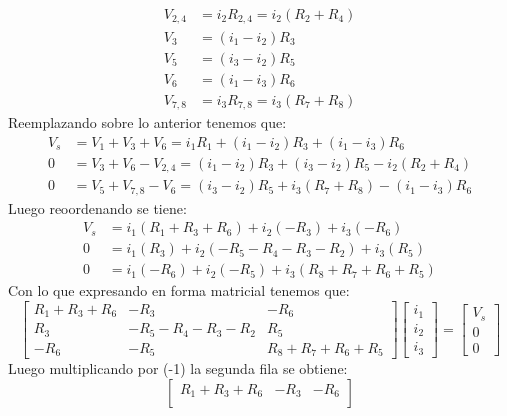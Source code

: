 \documentclass[
  11pt,
  letterpaper,
   addpoints,
   answers
  ]{exam}
\begin{document}
\begin{solution}
\begin{enumerate}
\begin{align}
        V_{2,4} &= i_2 R_{2,4}= i_2 (R_2 + R_4) \\
        V_3 &= (i_1 - i_2) R_3 \\
        V_5 &= (i_3 - i_2) R_5 \\
        V_6 &= (i_1 - i_3) R_6 \\
        V_{7,8} &= i_3 R_{7,8} = i_3 (R_7 + R_8)
    \end{align}
    Reemplazando sobre lo anterior tenemos que:
    \begin{align}
        V_s &= V_1 + V_3 + V_6 = i_1 R_1 + (i_1 - i_2) R_3 + (i_1 - i_3) R_6 \\
        0 &= V_3 + V_6 - V_{2,4}= (i_1 - i_2) R_3 + (i_3 - i_2) R_5 - i_2 (R_2 + R_4) \\
        0 &= V_5 + V_{7,8}- V_6 = (i_3 - i_2) R_5 + i_3 (R_7 + R_8) - (i_1 - i_3) R_6 
    \end{align}
    Luego reoordenando se tiene:
    \begin{align}
        V_s &= i_1 (R_1 + R_3 + R_6) + i_2 (-R_3) + i_3 (-R_6) \\
        0 &= i_1 (R_3) + i_2 (-R_5 - R_4 - R_3 - R_2) + i_3 (R_5) \\
        0 &= i_1 (-R_6) + i_2 (-R_5) + i_3 (R_8 + R_7 + R_6 + R_5) 
    \end{align}
    Con lo que expresando en forma matricial tenemos que:
    \begin{equation}
        \begin{bmatrix}
            R_1 + R_3 + R_6 & -R_3 & -R_6 \\
            R_3 & -R_5 - R_4 - R_3 - R_2 & R_5 \\
            -R_6 & -R_5 & R_8 + R_7 + R_6 + R_5
        \end{bmatrix}
        \begin{bmatrix}
            i_1 \\
            i_2 \\
            i_3
        \end{bmatrix}
        =
        \begin{bmatrix}
            V_s \\
            0 \\
            0
        \end{bmatrix}
    \end{equation}
    Luego multiplicando por (-1) la segunda fila se obtiene:
    \begin{equation}
        \begin{bmatrix}
            R_1 + R_3 + R_6 & -R_3 & -R_6 \\

\end{bmatrix}
\end{equation}
\end{enumerate}
\end{solution}
\end{document}
